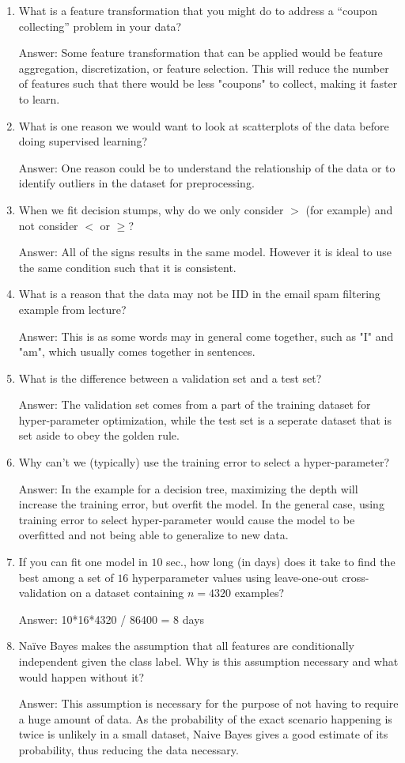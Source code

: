 \documentclass{article}
\def\ans#1{\par\gre{Answer: #1}}
\def\gre#1{{\color{gre}#1}}
\def\enum#1{\begin{enumerate}#1\end{enumerate}}
\begin{document}
\enum{
 \item What is a feature transformation that you might do to address a ``coupon collecting'' problem in your data?
\ans{Some feature transformation that can be applied would be feature aggregation, discretization, or feature selection. This will reduce the number of features such that there would be less "coupons" to collect, making it faster to learn.}
 \item What is one reason we would want to look at scatterplots of the data before doing supervised learning?
\ans{One reason could be to understand the relationship of the data or to identify outliers in the dataset for preprocessing.}
 \item When we fit decision stumps, why do we only consider $>$ (for example) and not consider $<$ or $\geq$?
\ans{All of the signs results in the same model. However it is ideal to use the same condition such that it is consistent. }
 \item What is a reason that the data may not be IID in the email spam filtering example from lecture?
\ans{This is as some words may in general come together, such as "I" and "am", which usually comes together in sentences.}
 \item What is the difference between a validation set and a test set?
\ans{The validation set comes from a part of the training dataset for hyper-parameter optimization, while the test set is a seperate dataset that is set aside to obey the golden rule.}
 \item Why can't we (typically) use the training error to select a hyper-parameter?
\ans{In the example for a decision tree, maximizing the depth will increase the training error, but overfit the model. In the general case, using training error to select hyper-parameter would cause the model to be overfitted and not being able to generalize to new data.}
 \item If you can fit one model in $10$ sec., how long (in days) does it take to find the best among a set of $16$ hyperparameter values using leave-one-out cross-validation on a dataset containing $n=4320$ examples?
\ans{10*16*4320 / 86400 = 8 days}
 \item{Na{\"i}ve Bayes makes the assumption that all features are conditionally independent given the class label. Why is this assumption necessary and what would happen without it?}
\ans{This assumption is necessary for the purpose of not having to require a huge amount of data. As the probability of the exact scenario happening is twice is unlikely in a small dataset, Naive Bayes gives a good estimate of its probability, thus reducing the data necessary. }
}
\end{document}
